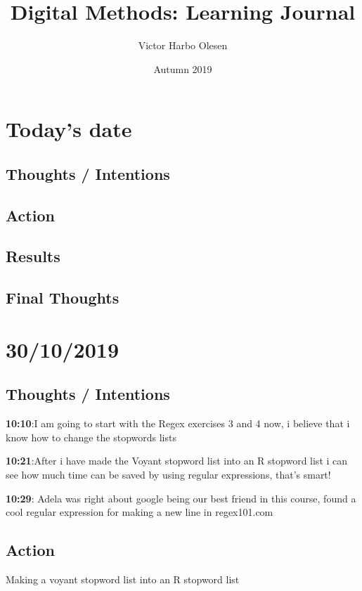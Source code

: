 \documentclass{article}
\title{Digital Methods: Learning Journal}
\author{Victor Harbo Olesen}
\date{Autumn 2019}
\begin{document}
\maketitle

\section{Today's date}
\subsection{Thoughts / Intentions}
\subsection{Action}
\subsection{Results}
\subsection{Final Thoughts}

\pagebreak{}

\section{30/10/2019}
\subsection{Thoughts / Intentions}

\textbf{10:10}:I am going to start with the Regex exercises 3 and 4 now, i believe that i know how to change the stopwords lists  


\textbf{10:21}:After i have made the Voyant stopword list into an R stopword list i can see how much time can be saved by using regular expressions, that's smart!

\textbf{10:29}: Adela was right about google being our best friend in this course, found a cool regular expression for making a new line in regex101.com

\subsection{Action}

Making a voyant stopword list into an R stopword list
\end{document}
